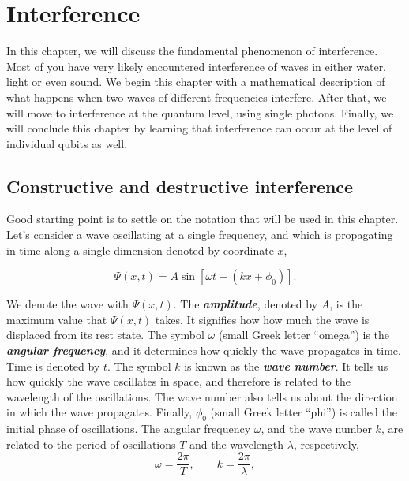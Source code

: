 \chapter{Interference}
\label{sec:6_interference}

In this chapter, we will discuss the fundamental phenomenon of interference.
Most of you have very likely encountered interference of waves in either water, light or even sound.
We begin this chapter with a mathematical description of what happens when two waves of different frequencies interfere.
After that, we will move to interference at the quantum level, using single photons.
Finally, we will conclude this chapter by learning that interference can occur at the level of individual qubits as well.


\section{Constructive and destructive interference}
\label{sec:6-1_constructive_and_destructive_interference}


Good starting point is to settle on the notation that will be used in this chapter.
Let's consider a wave oscillating at a single frequency, and which is propagating in time along a single dimension denoted by coordinate $x$,

\begin{equation}
    \Psi(x,t) = A \sin [\omega t-(k x+\phi_0)].
    \label{eq:simple_wave}
\end{equation}

We denote the wave with $\Psi(x,t)$.
The \textbf{\emph{amplitude}}, denoted by $A$, is the maximum value that $\Psi(x,t)$ takes.
It signifies how how much the wave is displaced from its rest state.
The symbol $\omega$ (small Greek letter ``omega'') is the \textbf{\emph{angular frequency}}, and it determines how quickly the wave propagates in time.
Time is denoted by $t$.
The symbol $k$ is known as the \textbf{\emph{wave number}}.
It tells us how quickly the wave oscillates in space, and therefore is related to the wavelength of the oscillations.
The wave number also tells us about the direction in which the wave propagates.
Finally, $\phi_0$ (small Greek letter ``phi'') is called the initial phase of oscillations.
The angular frequency $\omega$, and the wave number $k$, are related to the period of oscillations $T$ and the wavelength $\lambda$, respectively,
\begin{equation}
    \omega=\frac{2 \pi}{T}, \qquad k=\frac{2 \pi}{\lambda},
    \label{eq:freq-period_k-wavelength}
\end{equation}

